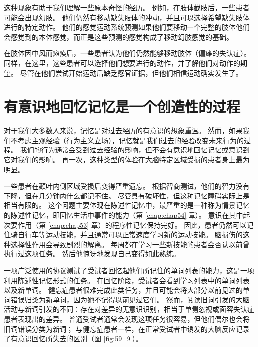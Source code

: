 这种现象有助于我们理解一些原本奇怪的经历。 例如，在肢体截肢后，一些患者可能会出现幻肢。 他们仍然有移动缺失肢体的冲动，并且可以选择希望缺失肢体进行的特定动作。 他们的感觉运动系统预测如果他们要移动一个完整的肢体他们会感觉到的本体感觉，而正是这些预测的感觉构成了移动幻肢感觉的基础。

在肢体因中风而瘫痪后，一些患者认为他们仍然能够移动肢体（偏瘫的失认症）。 同样，在这里，这些患者可以选择他们想要进行的动作，并了解他们对动作的期望。 尽管在他们尝试开始运动后缺乏感官证据，但他们相信运动确实发生了。


\section{有意识地回忆记忆是一个创造性的过程}
对于我们大多数人来说，记忆是对过去经历的有意识的想象重温。 然而，如果我们不考虑主观经验（行为主义立场），记忆就是我们过去的经验改变未来行为的过程。 我们的行为通常会受到过去经验的影响，但不会有意识地回忆记忆或意识到它对我们的影响。 再一次，这种类型的体验在大脑特定区域受损的患者身上最为明显。

一些患者在颞叶内侧区域受损后变得严重遗忘。 根据智商测试，他们的智力没有下降，但在几分钟内什么都记不住。 尽管具有破坏性，但这种记忆障碍实际上是相当有限的。 这个问题主要体现在陈述性记忆中，最严重的是一种称为情景记忆的陈述性记忆，即回忆生活中事件的能力（第 \ref{chap:chap54} 章）。 意识在其中起次要作用（第 \ref{chap:chap53} 章）的程序性记忆保持完好。 因此，患者仍然可以记住骑自行车等运动技能，并且通常可以正常速度学习新的运动技能。 脑损伤的这种选择性作用会导致剧烈的解离。 每周都在学习一些新技能的患者会否认以前曾执行过这项任务。 然后他惊讶地发现自己变得如此熟练。

一项广泛使用的协议测试了受试者回忆起他们所记住的单词列表的能力，这是一项利用陈述性记忆形式的任务。 在回忆阶段，受试者会看到学习列表中的单词列表以及新单词。 健忘症患者很难完成此类任务，并且可能会将大部分以前见过的单词错误归类为新单词，因为她不记得以前见过它们。 然而，阅读旧词引发的大脑活动与新词引发的不同：存在对差异的无意识识别，相当于单侧忽视或面容失认症患者表现出的差异。 普通受试者通常会发现这项任务很容易，但他们偶尔也会将旧词错误分类为新词； 与健忘症患者一样，在正常受试者中诱发的大脑反应记录了有意识回忆所失去的区别（图 \ref{fig:59_9}）。

